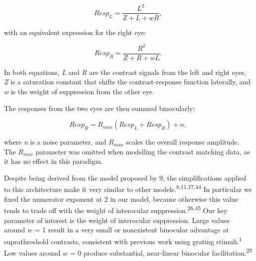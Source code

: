 \documentclass[
]{article}
\begin{document}
\begin{equation}
\label{eq:respL}
Resp_L = \frac{L^2}{Z + L + wR},
\end{equation}

with an equivalent expression for the right eye:

\begin{equation}
\label{eq:respR}
Resp_R = \frac{R^2}{Z + R + wL}.
\end{equation}

In both equations, \emph{L} and \emph{R} are the contrast signals from the left and right eyes, \emph{Z} is a saturation constant that shifts the contrast-response function laterally, and \emph{w} is the weight of suppression from the other eye.

The responses from the two eyes are then summed binocularly:

\begin{equation}
\label{eq:respB}
Resp_B = R_{max}(Resp_L + Resp_R) + n,
\end{equation}

where \emph{n} is a noise parameter, and \(R_{max}\) scales the overall response amplitude. The \(R_{max}\) parameter was omitted when modelling the contrast matching data, as it has no effect in this paradigm.

Despite being derived from the model proposed by 9, the simplifications applied to this architecture make it very similar to other models.\textsuperscript{8,11,17,44} In particular we fixed the numerator exponent at 2 in our model, because otherwise this value tends to trade off with the weight of interocular suppression.\textsuperscript{26,45} Our key parameter of interest is the weight of interocular suppression. Large values around \(w\) = 1 result in a very small or nonexistent binocular advantage at suprathreshold contrasts, consistent with previous work using grating stimuli.\textsuperscript{1} Low values around \(w\) = 0 produce substantial, near-linear binocular facilitation.\textsuperscript{25}
\end{document}
